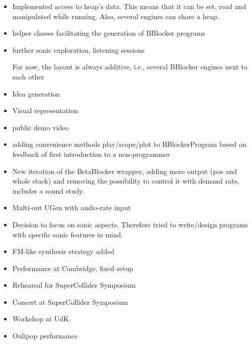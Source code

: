 \documentclass[letterpaper, 12pt]{article}
\begin{document}
\begin{itemize}	 
\item Implemented access to heap's data. This means that it can be set, read and manipulated while running. Also, several engines can share a heap. 
\item helper classes facilitating the generation of BBlocker programs 
\item further sonic exploration, listening sessions 

	For now, the layout is always additive, i.e., several BBlocker engines next to each other

\item Idea generation
\item Visual representation
\item public demo video
\item adding convenience methods play/scope/plot to BBlockerProgram based on feedback of first introduction to a non-programmer
\item New iteration of the BetaBlocker wrapper, adding more output (pos and whole stack) and removing the possibility to control it with demand rate,
	includes a sound study.
\item Multi-out UGen with audio-rate input
\item Decision to focus on sonic aspects. Therefore tried to write/design programs with specific sonic features in mind.
\item FM-like synthesis strategy added
\item Performance at Cambridge, fixed setup
\item Rehearsal for SuperCollider Symposium
\item Concert at SuperCollider Symposium
\item Workshop at UdK.
\item Oulipop performance
\end{itemize}
\end{document}
